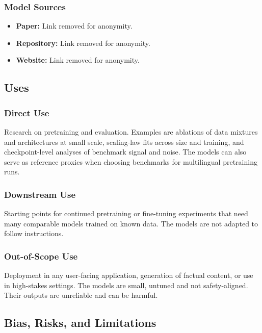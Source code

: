 \subsubsection*{Model Sources}

\begin{itemize}
    \item \textbf{Paper:} Link removed for anonymity.
    \item \textbf{Repository:} Link removed for anonymity.
    \item \textbf{Website:} Link removed for anonymity.
\end{itemize}

\subsection*{Uses}

\subsubsection*{Direct Use}

Research on pretraining and evaluation. Examples are ablations of data mixtures and architectures at small scale, scaling-law fits across size and training, and checkpoint-level analyses of benchmark signal and noise. The models can also serve as reference proxies when choosing benchmarks for multilingual pretraining runs.

\subsubsection*{Downstream Use}

Starting points for continued pretraining or fine-tuning experiments that need many comparable models trained on known data. The models are not adapted to follow instructions.

\subsubsection*{Out-of-Scope Use}

Deployment in any user-facing application, generation of factual content, or use in high-stakes settings. The models are small, untuned and not safety-aligned. Their outputs are unreliable and can be harmful.

\subsection*{Bias, Risks, and Limitations}

